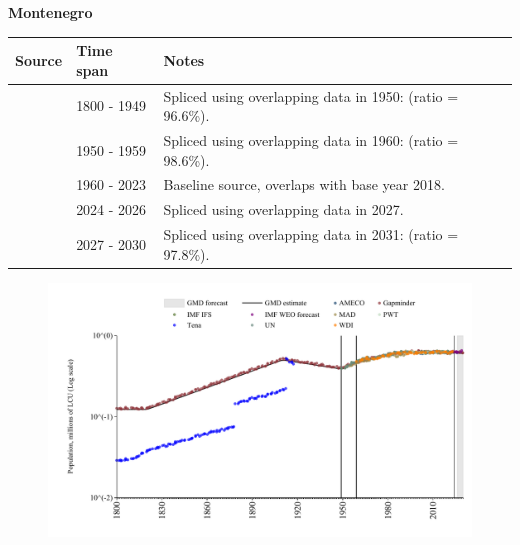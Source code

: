 \documentclass[12pt,a4paper,landscape]{article}
\begin{document}
\begin{adjustbox}{max totalsize={\paperwidth}{\paperheight},center}
\begin{minipage}[t][\textheight][t]{\textwidth}
\vspace*{0.5cm}
{}
\begin{center}
{\Large\bfseries Montenegro}
\end{center}
\vspace{0.5cm}
\begin{table}[H]
\centering
\small
\begin{tabular}{|l|l|l|}
\hline
\textbf{Source} & \textbf{Time span} & \textbf{Notes} \\
\hline
\rowcolor{white}\cite{Gapminder}& 1800 - 1949 &Spliced using overlapping data in 1950: (ratio = 96.6\%).\\
\rowcolor{lightgray}\cite{IMF_IFS}& 1950 - 1959 &Spliced using overlapping data in 1960: (ratio = 98.6\%).\\
\rowcolor{white}\cite{WDI}& 1960 - 2023 &Baseline source, overlaps with base year 2018.\\
\rowcolor{lightgray}\cite{AMECO}& 2024 - 2026 &Spliced using overlapping data in 2027.\\
\rowcolor{white}\cite{Gapminder}& 2027 - 2030 &Spliced using overlapping data in 2031: (ratio = 97.8\%).\\
\hline
\end{tabular}
\end{table}
\begin{figure}[H]
\centering
\includegraphics[width=\textwidth,height=0.6\textheight,keepaspectratio]{graphs/MNE_pop.pdf}
\end{figure}
\end{minipage}
\end{adjustbox}
\end{document}
